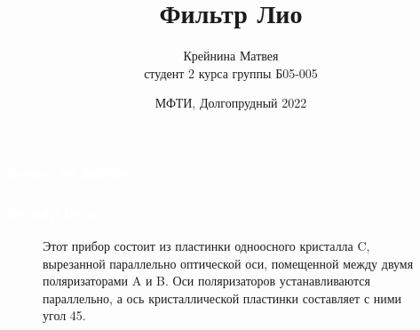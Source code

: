 \documentclass[aspectratio=169]{beamer}
\title{Фильтр Лио}
\date{\small{МФТИ, Долгопрудный 2022}}
\author{\small{Крейнина Матвея \\ студент 2 курса группы Б05-005}}
\begin{document}
\begin{frame}
  \frametitle{\textcolor{white}{Вопрос по выбору}} 
	\titlepage
\end{frame}

\begin{frame}
\frametitle{\textcolor{white}{Фильтр Вуда}}


\begin{figure}[h]
\begin{minipage}[h]{0.49\linewidth}
Этот прибор состоит из пластинки одноосного кристалла C, вырезанной параллельно оптической оси, помещенной между двумя поляризаторами A и B. Оси поляризаторов устанавливаются параллельно, а ось кристаллической пластинки составляет с ними угол 45\textdegree.
\end{minipage}
\begin{minipage}[h]{0.49\linewidth}
\end{minipage}
\end{figure}

\end{frame}
\end{document}

